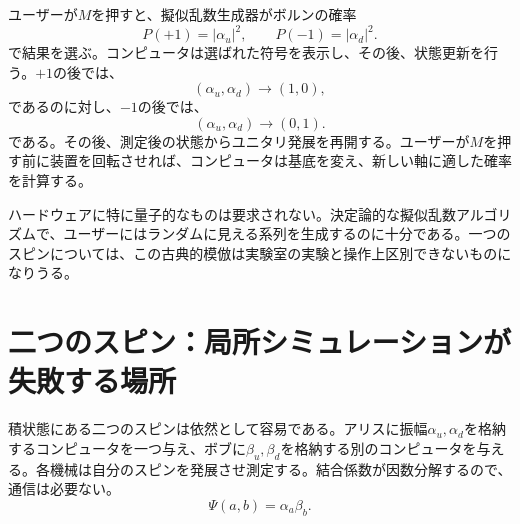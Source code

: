 ユーザーが\(M\)を押すと、擬似乱数生成器がボルンの確率
\begin{equation}
P(+1)=|\alpha_u|^2,
\qquad
P(-1)=|\alpha_d|^2.
\label{eq:l8-one-spin-born}
\end{equation}
で結果を選ぶ。コンピュータは選ばれた符号を表示し、その後、状態更新を行う。\(+1\)の後では、
\begin{equation}
(\alpha_u,\alpha_d)\longrightarrow(1,0),
\end{equation}
であるのに対し、\(-1\)の後では、
\begin{equation}
(\alpha_u,\alpha_d)\longrightarrow(0,1).
\end{equation}
である。その後、測定後の状態からユニタリ発展を再開する。ユーザーが\(M\)を押す前に装置を回転させれば、コンピュータは基底を変え、新しい軸に適した確率を計算する。

ハードウェアに特に量子的なものは要求されない。決定論的な擬似乱数アルゴリズムで、ユーザーにはランダムに見える系列を生成するのに十分である。一つのスピンについては、この古典的模倣は実験室の実験と操作上区別できないものになりうる。

\begin{classroomqa}
\end{classroomqa}

\begin{classroomqa}
\end{classroomqa}

\section{二つのスピン：局所シミュレーションが失敗する場所}

積状態にある二つのスピンは依然として容易である。アリスに振幅\(\alpha_u,\alpha_d\)を格納するコンピュータを一つ与え、ボブに\(\beta_u,\beta_d\)を格納する別のコンピュータを与える。各機械は自分のスピンを発展させ測定する。結合係数が因数分解するので、通信は必要ない。
\begin{equation}
\Psi(a,b)=\alpha_a\beta_b.
\end{equation}

